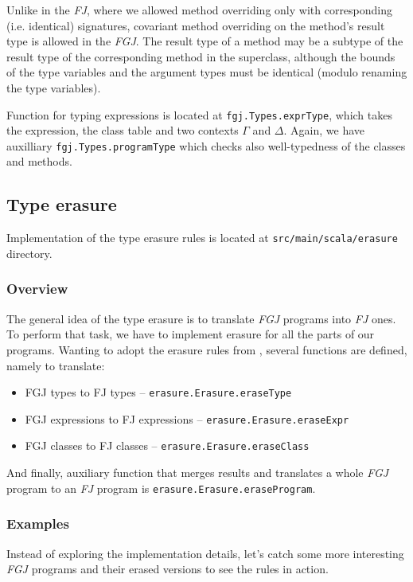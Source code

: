 \documentclass{article}[12pt]
\begin{document}
Unlike in the \emph{FJ}, where we allowed method overriding only with
corresponding (i.e. identical) signatures, covariant method overriding
on the method's result type is allowed in the \emph{FGJ}. The result
type of a method may be a subtype of the result type of the
corresponding method in the superclass, although the bounds of
the type variables and the argument types must be identical (modulo
renaming the type variables).

Function for typing expressions is located at
\texttt{fgj.Types.exprType}, which takes the expression, the class
table and two contexts $\Gamma$ and $\Delta$. Again, we have
auxilliary \texttt{fgj.Types.programType} which checks also
well-typedness of the classes and methods.


\subsection{Type erasure}

Implementation of the type erasure rules is located at
\texttt{src/main/scala/erasure} directory.

\subsubsection{Overview}

The general idea of the type erasure is to translate \emph{FGJ}
programs into \emph{FJ} ones. To perform that task, we have to
implement erasure for all the parts of our programs. Wanting to adopt
the erasure rules from \cite{fj}, several functions are defined,
namely to translate:

\begin{itemize}
\item FGJ types to FJ types -- \texttt{erasure.Erasure.eraseType}
\item FGJ expressions to FJ expressions --
  \texttt{erasure.Erasure.eraseExpr}
\item FGJ classes to FJ classes -- \texttt{erasure.Erasure.eraseClass}
\end{itemize}
And finally, auxiliary function that merges results and translates a
whole \emph{FGJ} program to an \emph{FJ} program is
\texttt{erasure.Erasure.eraseProgram}.

\subsubsection{Examples}

Instead of exploring the implementation details, let's catch some more
interesting \emph{FGJ} programs and their erased versions to see
the rules in action.
\end{document}
